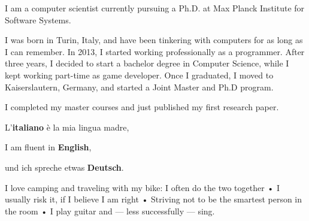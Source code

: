 


I am a computer scientist currently pursuing a Ph.D. at Max Planck Institute for Software Systems. 

I was born in Turin, Italy, and have been tinkering with computers for as long as I can remember. In 2013, I started working professionally as a programmer. After three years, I decided to start a bachelor degree in Computer Science, while I kept working part-time as game developer. Once I graduated, I moved to Kaiserslautern, Germany, and started a Joint Master and Ph.D program.

I completed my master courses and just published my first research paper.


L'\textbf{italiano} è la mia lingua madre,

I am fluent in \textbf{English},

und ich spreche etwas \textbf{Deutsch}.


I love camping and traveling with my bike: I often do the two together • I usually risk it, if I believe I am right • Striving not to be the smartest person in the room • I play guitar and --- less successfully --- sing.